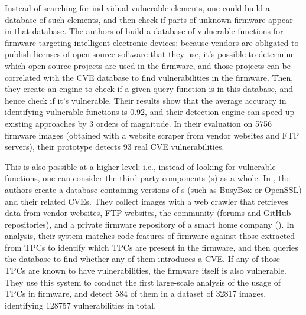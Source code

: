 Instead of searching for individual vulnerable elements, one could build a database of such elements, and then check if parts of unknown firmware appear in that database.
The authors of  build a database of vulnerable functions for firmware targeting intelligent electronic devices: because vendors are obligated to publish licenses of open source software that they use, it's possible to determine which open source projects are used in the firmware, and those projects can be correlated with the CVE database to find vulnerabilities in the firmware.
Then, they create an engine to check if a given query function is in this database, and hence check if it's vulnerable.
Their results show that the average accuracy in identifying vulnerable functions is 0.92, and their detection engine can speed up existing approaches by 3 orders of magnitude.
In their evaluation on \num{5756} firmware images (obtained with a website scraper from vendor websites and FTP servers), their prototype detects \num{93} real CVE vulnerabilities.

This is also possible at a higher level; i.e., instead of looking for vulnerable functions, one can consider the third-party components (s) as a whole.
In , the authors create a database containing versions of s (such as BusyBox or OpenSSL) and their related CVEs.
They collect images with a web crawler that retrieves data from vendor websites, FTP websites, the community (forums and GitHub repositories), and a private firmware repository of a smart home company ().
In analysis, their system matches code features of firmware against those extracted from TPCs to identify which TPCs are present in the firmware, and then queries the database to find whether any of them introduces a CVE.
If any of those TPCs are known to have vulnerabilities, the firmware itself is also vulnerable.
They use this system to conduct the first large-scale analysis of the usage of TPCs in firmware, and detect \num{584} of them in a dataset of \num{32817} images, identifying \num{128757} vulnerabilities in total.

